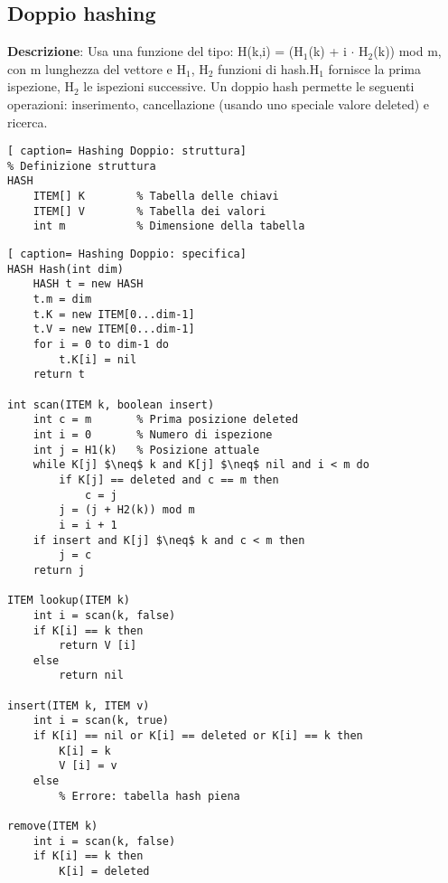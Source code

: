 \documentclass[../cheatSheetAlgoritmi.tex]{subfiles}
\begin{document}
\subsection{Doppio hashing}
\textbf{Descrizione}: Usa una funzione del tipo: H(k,i) = (H$_{1}$(k) + i $\cdot$ H$_{2}$(k)) mod m, con m lunghezza del vettore e H$_{1}$, H$_{2}$ funzioni di hash.H$_{1}$ fornisce la prima ispezione, H$_{2}$ le ispezioni successive. Un doppio hash permette le seguenti operazioni: inserimento, cancellazione (usando uno speciale valore deleted) e ricerca. 
\begin{lstlisting}[ caption= Hashing Doppio: struttura]
% Definizione struttura
HASH
	ITEM[] K		% Tabella delle chiavi
	ITEM[] V		% Tabella dei valori
	int m			% Dimensione della tabella
\end{lstlisting}
\newpage
\begin{lstlisting}[ caption= Hashing Doppio: specifica]
HASH Hash(int dim)
	HASH t = new HASH
	t.m = dim
	t.K = new ITEM[0...dim-1]
	t.V = new ITEM[0...dim-1]
	for i = 0 to dim-1 do
		t.K[i] = nil
	return t
	
int scan(ITEM k, boolean insert)
	int c = m		% Prima posizione deleted
	int i = 0		% Numero di ispezione
	int j = H1(k)	% Posizione attuale
	while K[j] $\neq$ k and K[j] $\neq$ nil and i < m do
		if K[j] == deleted and c == m then
			c = j
		j = (j + H2(k)) mod m
		i = i + 1
	if insert and K[j] $\neq$ k and c < m then
		j = c
	return j	
	
ITEM lookup(ITEM k)
	int i = scan(k, false)
	if K[i] == k then
		return V [i]
	else
		return nil
		
insert(ITEM k, ITEM v)
	int i = scan(k, true)
	if K[i] == nil or K[i] == deleted or K[i] == k then
		K[i] = k
		V [i] = v
	else
		% Errore: tabella hash piena
		
remove(ITEM k)
	int i = scan(k, false)
	if K[i] == k then
		K[i] = deleted
\end{lstlisting}

\newpage
\end{document}
